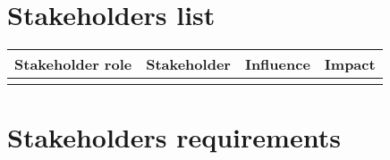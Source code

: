 \section{Stakeholders list}

\begin{tabular}{ | c | c | c | c | }
	\hline
	Stakeholder role & Stakeholder & Influence & Impact \\ \hline
	& & & \\ \hline
\end{tabular}


\section{Stakeholders requirements}

